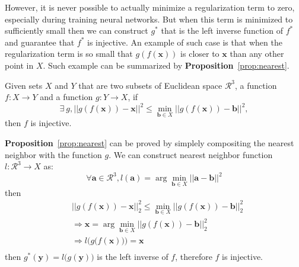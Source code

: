 However, it is never possible to actually minimize a regularization term to zero, especially during training neural networks. But when this term is minimized to sufficiently small then we can construct $g^*$ that is the left inverse function of $f^*$ and guarantee that $f^*$ is injective. An example of such case is that when the regularization term is so small that $g(f(\mathbf{x}))$ is closer to $\mathbf{x}$ than any other point in $X$. Such example can be summarized by \textbf{Proposition}~\ref{prop:nearest}.

\begin{m_prop}
	\label{prop:nearest}
	Given sets $X$ and $Y$ that are two subsets of Euclidean space $\mathcal{R}^3$, a function $f:X \rightarrow Y$  and a function $g:Y \rightarrow X$, if
	\begin{equation}
	\exists~g, || g(f(\mathbf{x})) - \mathbf{x} ||^2 \leq \min_{\mathbf{b} \in X}|| g(f(\mathbf{x})) - \mathbf{b} ||^2,
	\end{equation}
	then $f$ is injective.
\end{m_prop}

\textbf{Proposition}~\ref{prop:nearest} can be proved by simplely compositing the nearest neighbor with the function $g$. We can construct nearest neighbor function $l: \mathcal{R}^3 \rightarrow X $ as:
\begin{equation}
\forall \mathbf{a} \in \mathcal{R}^3, l(\mathbf{a}) = \arg\min_{\mathbf{b} \in X} || \mathbf{a} - \mathbf{b} ||^2
\end{equation}
then
\begin{equation}
\begin{aligned}
&|| g(f(\mathbf{x})) - \mathbf{x} ||_2^2 \leq \min_{\mathbf{b} \in X}|| g(f(\mathbf{x})) - \mathbf{b} ||_2^2\\
&\Rightarrow \mathbf{x} = \arg\min_{\mathbf{b} \in X}|| g(f(\mathbf{x})) - \mathbf{b} ||_2^2\\
&\Rightarrow l\Big(g\big(f(\mathbf{x})\big)\Big) = \mathbf{x}\\
\end{aligned}
\end{equation}
then $g^*(\mathbf{y}) = l\big(g(\mathbf{y})\big)$ is the left inverse of $f$, therefore $f$ is injective.

